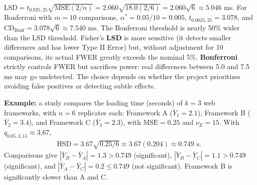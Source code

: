 \begin{solproblema}[prob:271e3ee]
$\text{LSD}=t_{0.025,25}\sqrt{\text{MSE}(2/n)}=2.060\sqrt{18.0(2/6)}=2.060\sqrt6\approx5.046$ ms. For Bonferroni with $m=10$ comparisons, $\alpha^*=0.05/10=0.005$, $t_{0.0025,25}=3.078$, and $\text{CD}_{\text{Bonf}}=3.078\sqrt6\approx7.540$ ms. The Bonferroni threshold is nearly 50\% wider than the LSD threshold. Fisher's \textbf{LSD} is more sensitive (it detects smaller differences and has lower Type II Error) but, without adjustment for 10 comparisons, its actual FWER greatly exceeds the nominal 5\%. \textbf{Bonferroni} strictly controls FWER but sacrifices power: real differences between 5.0 and 7.5 ms may go undetected. The choice depends on whether the project prioritizes avoiding false positives or detecting subtle effects.
\end{solproblema}

\begin{solproblema}[prob:2ed3d37]
\textbf{Example:} a study compares the loading time (seconds) of $k=3$ web frameworks, with $n=6$ replicates each: Framework A ($\bar Y_1=2.1$), Framework B ($\bar Y_2=3.4$), and Framework C ($\bar Y_3=2.3$), with $\text{MSE}=0.25$ and $\nu_E=15$. With $q_{0.05,3,15}\approx3.67$,
\begin{align*}
\text{HSD}=3.67\sqrt{0.25/6}\approx3.67(0.204)\approx0.749\text{ s}.
\end{align*}
Comparisons give $|\bar Y_B-\bar Y_A|=1.3>0.749$ (significant), $|\bar Y_B-\bar Y_C|=1.1>0.749$ (significant), and $|\bar Y_A-\bar Y_C|=0.2\le0.749$ (not significant). Framework B is significantly slower than A and C.
\end{solproblema}
